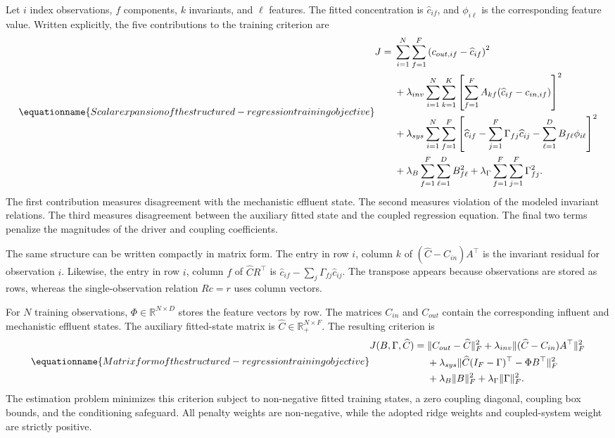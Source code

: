 Let \(i\) index observations, \(f\) components, \(k\) invariants, and \(\ell\) features. The fitted concentration is \(\widehat c_{if}\), and \(\phi_{i\ell}\) is the corresponding feature value. Written explicitly, the five contributions to the training criterion are
\begin{equation}
\equationname{Scalar expansion of the structured-regression training objective}
\label{eq:icsor_training_scalar}
\begin{aligned}
J={}&\sum_{i=1}^{N}\sum_{f=1}^{F}
\left(c_{out,if}-\widehat c_{if}\right)^2\\
&+\lambda_{inv}\sum_{i=1}^{N}\sum_{k=1}^{K}
\left[\sum_{f=1}^{F}A_{kf}(\widehat c_{if}-c_{in,if})\right]^2\\
&+\lambda_{sys}\sum_{i=1}^{N}\sum_{f=1}^{F}
\left[\widehat c_{if}-\sum_{j=1}^{F}\Gamma_{fj}\widehat c_{ij}
-\sum_{\ell=1}^{D}B_{f\ell}\phi_{i\ell}\right]^2\\
&+\lambda_B\sum_{f=1}^{F}\sum_{\ell=1}^{D}B_{f\ell}^2
+\lambda_{\Gamma}\sum_{f=1}^{F}\sum_{j=1}^{F}\Gamma_{fj}^2.
\end{aligned}
\end{equation}
The first contribution measures disagreement with the mechanistic effluent state. The second measures violation of the modeled invariant relations. The third measures disagreement between the auxiliary fitted state and the coupled regression equation. The final two terms penalize the magnitudes of the driver and coupling coefficients.

The same structure can be written compactly in matrix form. The entry in row \(i\), column \(k\) of \((\widehat C-C_{in})A^\top\) is the invariant residual for observation \(i\). Likewise, the entry in row \(i\), column \(f\) of \(\widehat C R^\top\) is \(\widehat c_{if}-\sum_j\Gamma_{fj}\widehat c_{ij}\). The transpose appears because observations are stored as rows, whereas the single-observation relation \(Rc=r\) uses column vectors.

For \(N\) training observations, \(\Phi\in\mathbb{R}^{N\times D}\) stores the feature vectors by row. The matrices \(C_{in}\) and \(C_{out}\) contain the corresponding influent and mechanistic effluent states. The auxiliary fitted-state matrix is \(\widehat C\in\mathbb{R}_{+}^{N\times F}\). The resulting criterion is
\begin{equation}
\equationname{Matrix form of the structured-regression training objective}
\label{eq:icsor_training_objective}
\begin{aligned}
J(B,\Gamma,\widehat C)={}&
\|C_{out}-\widehat C\|_F^2
+\lambda_{inv}\| (\widehat C-C_{in})A^\top\|_F^2\\
&+\lambda_{sys}\|\widehat C(I_F-\Gamma)^\top-\Phi B^\top\|_F^2\\
&+\lambda_B\|B\|_F^2+\lambda_{\Gamma}\|\Gamma\|_F^2.
\end{aligned}
\end{equation}
The estimation problem minimizes this criterion subject to non-negative fitted training states, a zero coupling diagonal, coupling box bounds, and the conditioning safeguard. All penalty weights are non-negative, while the adopted ridge weights and coupled-system weight are strictly positive.


